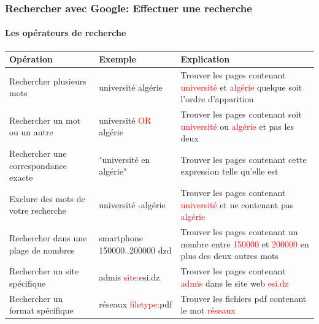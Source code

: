 \documentclass{beamer}
\begin{document}
\begin{frame}
\frametitle{Rechercher avec Google: Effectuer une recherche}
\framesubtitle{Les opérateurs de recherche}

\scriptsize\bfseries
\begin{tabular}{p{}p{}p{}}
	
	\hline
	Opération & Exemple & Explication \\
	\hline 
	
	Rechercher plusieurs mots & université algérie & 
	Trouver les pages contenant \textcolor{red}{université} et \textcolor{red}{algérie} quelque soit l'ordre d'apparition \\
	\hline
	
	Rechercher un mot ou un autre & université \textcolor{red}{OR} algérie & 
	Trouver les pages contenant soit \textcolor{red}{université} ou \textcolor{red}{algérie} et pas les deux \\
	\hline
	
	Rechercher une correspondance exacte & \textcolor{red}{"}université en algérie\textcolor{red}{"} & 
	Trouver les pages contenant cette expression telle qu'elle est \\
	\hline
	
	Exclure des mots de votre recherche & université \textcolor{red}{-}algérie & 
	Trouver les pages contenant \textcolor{red}{université} et ne contenant pas \textcolor{red}{algérie}\\
	\hline
	
	Rechercher dans une plage de nombres & smartphone 150000\textcolor{red}{..}200000 dzd & 
	Trouver les pages contenant un nombre entre \textcolor{red}{150000} et \textcolor{red}{200000} en plus des deux autres mots\\
	\hline
	
	Rechercher un site spécifique & admis \textcolor{red}{\NoAutoSpacing site:}esi.dz & 
	Trouver les pages contenant \textcolor{red}{admis} dans le site web \textcolor{red}{esi.dz} \\
	\hline
	
	Rechercher un format spécifique & réseaux \textcolor{red}{\NoAutoSpacing filetype:}pdf & 
	Trouver les fichiers pdf contenant le mot \textcolor{red}{réseaux}\\
	\hline
	
	
\end{tabular}


\end{frame}
\end{document}
